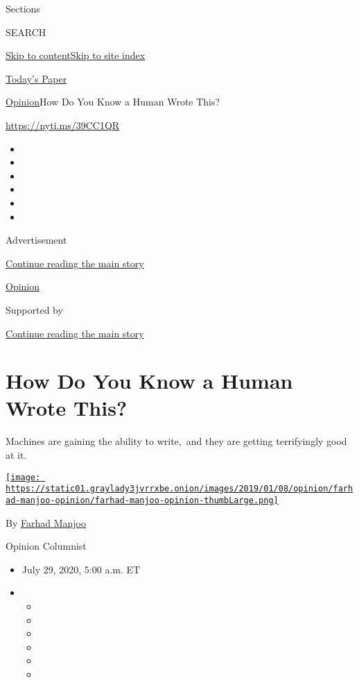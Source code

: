 Sections

SEARCH

\protect\hyperlink{site-content}{Skip to
content}\protect\hyperlink{site-index}{Skip to site index}

\href{https://myaccount.nytimes3xbfgragh.onion/auth/login?response_type=cookie\&client_id=vi}{}

\href{https://www.nytimes3xbfgragh.onion/section/todayspaper}{Today's
Paper}

\href{/section/opinion}{Opinion}\textbar{}How Do You Know a Human Wrote
This?

\url{https://nyti.ms/39CC1QR}

\begin{itemize}
\item
\item
\item
\item
\item
\item
\end{itemize}

Advertisement

\protect\hyperlink{after-top}{Continue reading the main story}

\href{/section/opinion}{Opinion}

Supported by

\protect\hyperlink{after-sponsor}{Continue reading the main story}

\hypertarget{how-do-you-know-a-human-wrote-this}{%
\section{How Do You Know a Human Wrote
This?}\label{how-do-you-know-a-human-wrote-this}}

Machines are gaining the ability to write,~and they are getting
terrifyingly good at it.

\href{https://www.nytimes3xbfgragh.onion/by/farhad-manjoo}{\texttt{[image: https://static01.graylady3jvrrxbe.onion/images/2019/01/08/opinion/farhad-manjoo-opinion/farhad-manjoo-opinion-thumbLarge.png]}}

By \href{https://www.nytimes3xbfgragh.onion/by/farhad-manjoo}{Farhad
Manjoo}

Opinion Columnist

\begin{itemize}
\item
  July 29, 2020, 5:00 a.m. ET
\item
  \begin{itemize}
  \item
  \item
  \item
  \item
  \item
  \item
  \end{itemize}
\end{itemize}

